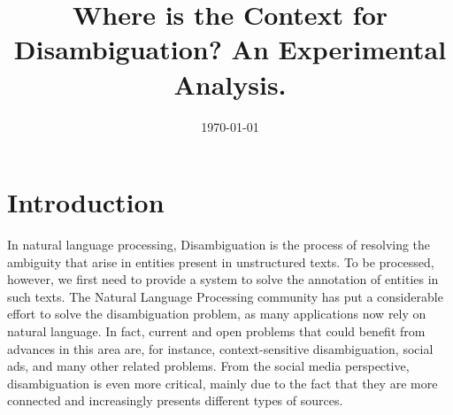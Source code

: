 \documentclass[10pt,a4paper]{article}
\title{Where is the Context for Disambiguation? An Experimental Analysis.}
\date{\today}
\newcommand{\todo}[1]{{\color{red}\textsf{\textbf{TODO}}: #1}}
\begin{document}
\maketitle





\section{Introduction}


In natural language processing, Disambiguation is the process of resolving  the ambiguity  that arise in entities present in unstructured texts. To be processed, however, we first need to provide a system to solve the annotation of entities in such texts.  The Natural Language Processing community has put a considerable effort to solve the disambiguation problem, as many applications now rely on natural language. In fact, current and open problems that could  benefit from advances in this area are, for instance, context-sensitive  disambiguation, social ads, and many other related problems. From the social media perspective, disambiguation is even more critical, mainly due to the fact that they are more connected and increasingly presents different types of sources.
\end{document}
